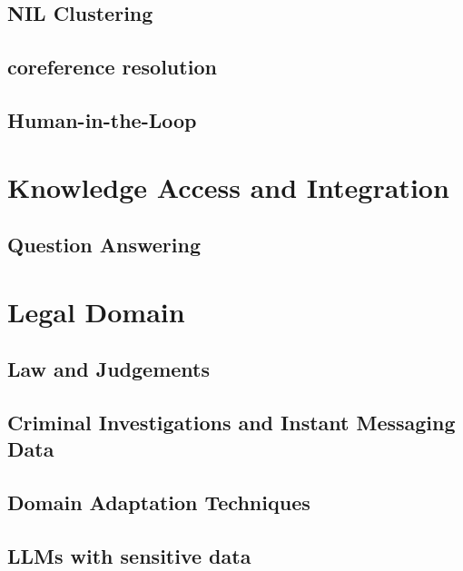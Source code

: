 \subsection{NIL Clustering}
\subsection{coreference resolution}
\subsection{Human-in-the-Loop}

\section{Knowledge Access and Integration}
\subsection{Question Answering}


\section{Legal Domain}
\subsection{Law and Judgements}
\subsection{Criminal Investigations and Instant Messaging Data}
\subsection{Domain Adaptation Techniques}
\subsection{LLMs with sensitive data}

